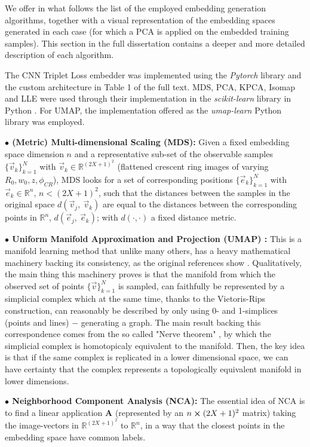 \documentclass[11pt, a4paper, twoside]{article} %
\newcommand{\R}{\mathbb{R}} %
\begin{document}
We offer in what follows the list of the employed embedding generation algorithms, together with a visual representation of the embedding spaces generated in each case (for which a PCA is applied on the embedded training samples). This section in the full dissertation contains a deeper and more detailed description of each algorithm.

The CNN Triplet Loss embedder was implemented using the {\em Pytorch} library \cite{pytorch} and the custom architecture in Table 1 of the full text. MDS, PCA, KPCA, Isomap and LLE were used through their implementation in the {\em scikit-learn} library in Python \cite{sklearn}. For UMAP, the implementation offered as the {\em umap-learn} \cite{umaplearn} Python library was employed.


{\bf $\bullet$ (Metric) Multi-dimensional Scaling (MDS):} Given a fixed embedding space dimension $n$ and a representative sub-set of the observable samples $\{\vec{v}_k\}_{k=1}^{N}$ with $\vec{v}_k\in\R^{(2X+1)^2}$ (flattened crescent ring images of varying $R_0,w_0,z,\phi_{CR}$), MDS \cite{MDS} looks for a set of corresponding positions $\{ \vec{e}_k \}_{k=1}^N$ with $\vec{e}_k\in\R^n$, $n<(2X+1)^2$, such that the distances between the samples in the original space $d(\vec{v}_j,\ \vec{v}_k)$ are equal to the distances between the corresponding points in $\R^n$, $d(\vec{e}_j,\ \vec{e}_k)$; with $d(\cdot,\cdot)$ a fixed distance metric.


{\bf $\bullet$ Uniform Manifold Approximation and Projection (UMAP) :} This is a manifold learning method that unlike many others, has a heavy mathematical machinery backing its consistency, as the original references show \cite{umap,umaplearn}. Qualitatively, the main thing this machinery proves is that the manifold from which the observed set of points $\{\vec{v}\}_{k=1}^N$ is sampled, can faithfully be represented by a simplicial complex which at the same time, thanks to the Vietoris-Rips construction, can reasonably be described by only using 0- and 1-simplices (points and lines) $-$ generating a graph. The main result backing this correspondence comes from the so called "Nerve theorem" \cite{ umap}, by which the simplicial complex is homotopicaly equivalent to the manifold. Then, the key idea is that if the same complex is replicated in a lower dimensional space, we can have certainty that the complex represents a topologically equivalent manifold in lower dimensions. 

{\bf $\bullet$ Neighborhood Component Analysis (NCA): }The essential idea of NCA \cite{NCA} is to find a linear application $\pmb{A}$ (represented by an $n\cross (2X+1)^2$ matrix) taking the image-vectors in $\R^{(2X+1)^2}$ to $\R^n$, in a way that the closest points in the embedding space have common labels. 
\end{document}

